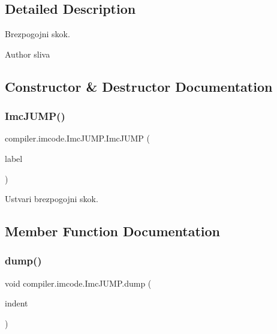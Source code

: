 \subsection{Detailed Description}
Brezpogojni skok.

\begin{DoxyAuthor}{Author}
sliva 
\end{DoxyAuthor}


\subsection{Constructor \& Destructor Documentation}
\mbox{\label{classcompiler_1_1imcode_1_1_imc_j_u_m_p_acae3a1008cc2a32818cfa7e7f08d3ce3}} 
\subsubsection{\texorpdfstring{Imc\+J\+U\+M\+P()}{ImcJUMP()}}
{\footnotesize\ttfamily compiler.\+imcode.\+Imc\+J\+U\+M\+P.\+Imc\+J\+U\+MP (\begin{DoxyParamCaption}\item[{\hyperlink{classcompiler_1_1frames_1_1_frm_label}{Frm\+Label}}]{label }\end{DoxyParamCaption})}

Ustvari brezpogojni skok. 

\subsection{Member Function Documentation}
\mbox{\label{classcompiler_1_1imcode_1_1_imc_j_u_m_p_ad53ded13619238b0fb2696a4aade579f}} 
\subsubsection{\texorpdfstring{dump()}{dump()}}
{\footnotesize\ttfamily void compiler.\+imcode.\+Imc\+J\+U\+M\+P.\+dump (\begin{DoxyParamCaption}\item[{int}]{indent }\end{DoxyParamCaption})}

